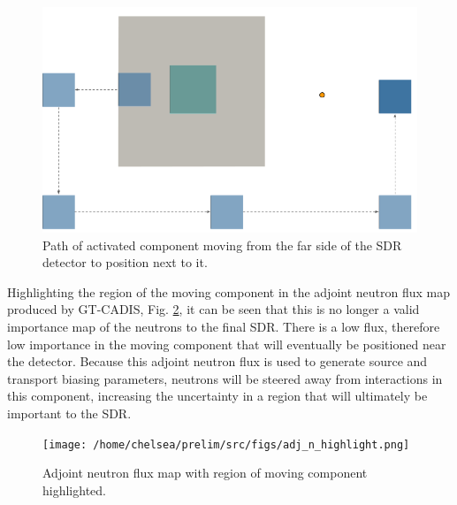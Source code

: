 \begin{figure} 
	\includegraphics[scale=0.6]{figs/moving_comp_path.png}
	\caption[Path of moving component]
	{Path of activated component moving from the far side of the SDR
	detector to position next to it.\label{fig:path}}
\end{figure}

Highlighting the region of the moving component in the  adjoint neutron flux
map produced by GT-CADIS, Fig. \ref{fig:highlight}, it can be seen that this 
is no longer a valid importance map
of the neutrons to the final SDR. There is a low flux, therefore low
importance in the moving component that will eventually be positioned 
near the detector.  Because this adjoint neutron flux is used to generate
source and transport biasing parameters, neutrons will be steered away from 
interactions in this component, increasing the uncertainty in a region that will
ultimately be important to the SDR. 

\begin{figure} 
	\texttt{[image: /home/chelsea/prelim/src/figs/adj\_n\_highlight.png]}
	\caption[Adjoint neutron flux map with region of moving component
	highlighted.]
	{Adjoint neutron flux map with region of moving component
	highlighted. \label{fig:highlight}}
\end{figure}



